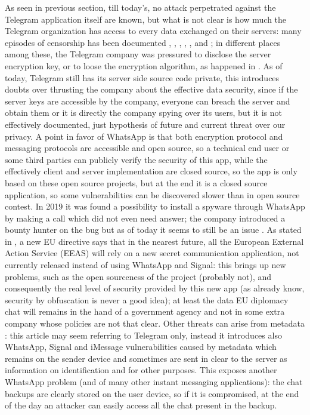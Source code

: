 \documentclass{article}
\begin{document}
As seen in previous section, till today's, no attack perpetrated against the Telegram application itself are known, but what is not clear is how much the Telegram organization has access to every data exchanged on their servers: many episodes of censorship has been documented \cite{china_cen}, \cite{honk_cen}, \cite{bahrain_cen}, \cite{pakistan_cen}, \cite{india_cen}, \cite{russia_cen} and \cite{iran_cen}; in different places among these, the Telegram company was pressured to disclose the server encryption key, or to loose the encryption algorithm, as happened in \cite{usa_weak}.\newline
As of today, Telegram still has its server side source code private, this introduces doubts over thrusting the company about the effective data security, since if the server keys are accessible by the company, everyone can breach the server and obtain them or it is directly the company spying over its users, but it is not effectively documented, just hypothesis of future and current threat over our privacy.\newline
A point in favor of WhatsApp is that both encryption protocol and messaging protocols are accessible and open source, so a technical end user or some third parties can publicly verify the security of this app, while the effectively client and server implementation are closed source, so the app is only based on these open source projects, but at the end it is a closed source application, so some vulnerabilities can be discovered slower than in open source contest.\newline
In 2019 it was found a possibility to install a spyware through WhatsApp by making a call which did not even need answer; the company introduced a bounty hunter on the bug but as of today it seems to still be an issue \cite{what_threat}.\newline
As stated in \cite{new_EU}, a new EU directive says that in the nearest future, all the European External Action Service (EEAS) will rely on a new secret communication application, not currently released instead of using WhatsApp and Signal: this brings up new problems, such as the open sourceness of the project (probably not), and consequently the real level of security provided by this new app (as already know, security by obfuscation is never a good idea); at least the data EU diplomacy chat will remains in the hand of a government agency and not in some extra company whose policies are not that clear.\newline
Other threats can arise from metadata \cite{threat}: this article may seem referring to Telegram only, instead it introduces also WhatsApp, Signal and iMessage vulnerabilities caused by metadata which remains on the sender device and sometimes are sent in clear to the server as information on identification and for other purposes. This exposes another WhatsApp problem (and of many other instant messaging applications): the chat backups are clearly stored on the user device, so if it is compromised, at the end of the day an attacker can easily access all the chat present in the backup.\newline
\end{document}
